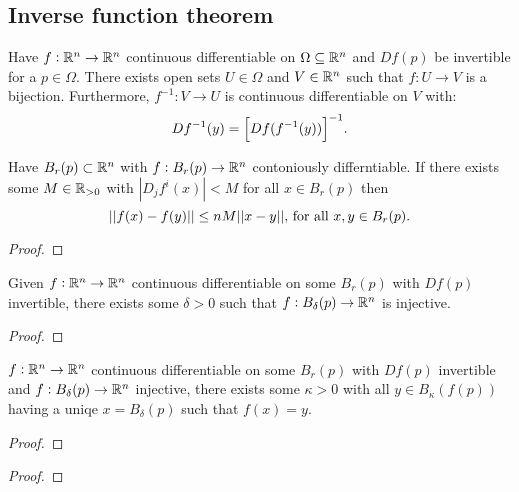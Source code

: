 \documentclass[../Year2.tex]{subfiles}
\begin{document}
\subsection{Inverse function theorem}

\begin{theorem}\label{inv}
    Have $f:\mathbb{R}^n\rightarrow \mathbb{R}^n$ continuous differentiable on $\Omega\subseteq\mathbb{R}^n$ and $Df(p)$ be invertible for a $p\in\Omega$. There exists open sets $U\in\Omega$ and $V\in\mathbb{R}^n$ such that $f:U\rightarrow V$ is a bijection. Furthermore, $f^{-1}:V\rightarrow U$ is continuous differentiable on $V$ with: \[
        Df^{-1}(y)={\left[Df(f^{-1}(y))\right]}^{-1}\text{\textcolor{black}{.}}
    \]
    \vspace{-20pt}
\end{theorem}

\begin{lemma}
    Have $B_r(p)\subset\mathbb{R}^n$ with $f:B_r(p)\rightarrow\mathbb{R}^n$ contoniously differntiable. If there exists some $M\in\mathbb{R}_{>0}$ with $|D_j f^i(x)|< M$ for all $x\in B_r(p)$ then \[
        ||f(x)-f(y)||\leq nM||x-y||\text{\textcolor{black}{, for all }} x,y\in B_r(p)\text{\textcolor{black}{.}}
    \]
    \begin{proof}
        
    \end{proof}
\end{lemma}

\begin{lemma}
    Given $f:\mathbb{R}^n\rightarrow\mathbb{R}^n$ continuous differentiable on some $B_r(p)$ with $Df(p)$ invertible, there exists some $\delta>0$ such that $f:B_\delta(p)\rightarrow\mathbb{R}^n$ is injective.
    \begin{proof}
        
    \end{proof}
\end{lemma}

\begin{lemma}\label{inv1}
    $f:\mathbb{R}^n\rightarrow\mathbb{R}^n$ continuous differentiable on some $B_r(p)$ with $Df(p)$ invertible and $f:B_\delta(p)\rightarrow\mathbb{R}^n$ injective, there exists some $\kappa>0$ with all $y\in B_\kappa(f(p))$ having a uniqe $x=B_\delta(p)$ such that $f(x)=y$.
    \begin{proof}
        
    \end{proof}
\end{lemma}

\begin{lemma}
    \begin{proof}
        
    \end{proof}
\end{lemma}
\end{document}
